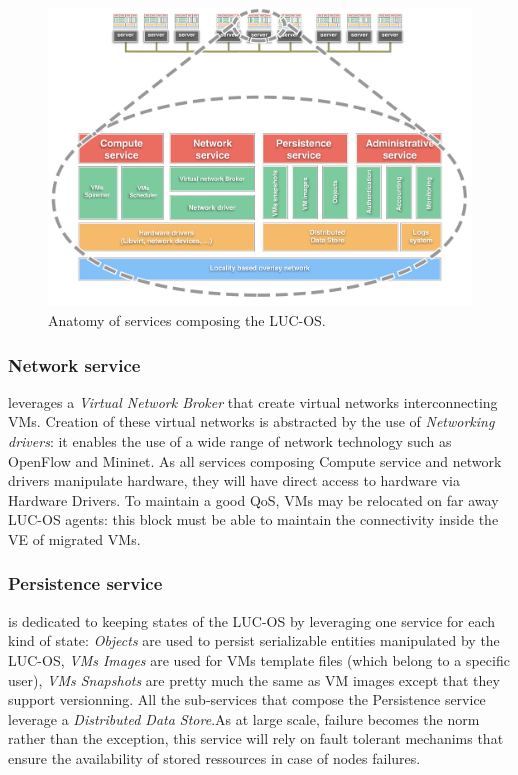 \begin{figure}
  \centerline{
   \includegraphics[width=1.55\linewidth]{Figures/lucos_agents.pdf}
  }
  \caption{Anatomy of services composing the LUC-OS.}%
  \label{fig:anatomy}%
\end{figure}

\subsubsection{Network service} 
leverages a \emph{Virtual Network Broker} that create virtual networks 
interconnecting VMs. Creation of these virtual networks is abstracted by the use
of \emph{Networking drivers}: it enables the use of a wide range of network 
technology such as OpenFlow and Mininet. As all services composing Compute 
service and network drivers manipulate hardware, they will have direct access to
hardware via Hardware Drivers. To maintain a good QoS, VMs may be relocated on 
far away LUC-OS agents: this block must be able to maintain the connectivity 
inside the VE of migrated VMs.

\subsubsection{Persistence service}
is dedicated to keeping states of the LUC-OS by leveraging one service for each
kind of state: \emph{Objects} are used to persist serializable entities 
manipulated by the LUC-OS, \emph{VMs Images} are used for VMs template files 
(which belong to a specific user), \emph{VMs Snapshots} are pretty much the same
as VM images except that they support versionning. All the sub-services that 
compose the Persistence service leverage a \emph{Distributed Data Store}.As at 
large scale, failure becomes the norm rather than the exception, this service 
will rely on fault tolerant mechanims that ensure the availability of stored 
ressources in case of nodes failures.

